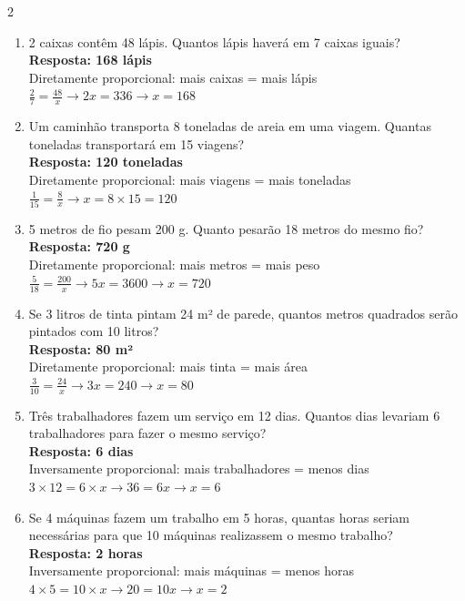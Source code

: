 \documentclass[11pt]{article}
\begin{document}
\begin{multicols}{2}
\begin{enumerate}[leftmargin=*, itemsep=15pt]
\item 2 caixas contêm 48 lápis. Quantos lápis haverá em 7 caixas iguais? \\
\textbf{Resposta: 168 lápis} \\
Diretamente proporcional: mais caixas = mais lápis \\
$\frac{2}{7} = \frac{48}{x} \rightarrow 2x = 336 \rightarrow x = 168$

\item Um caminhão transporta 8 toneladas de areia em uma viagem. Quantas toneladas transportará em 15 viagens? \\
\textbf{Resposta: 120 toneladas} \\
Diretamente proporcional: mais viagens = mais toneladas \\
$\frac{1}{15} = \frac{8}{x} \rightarrow x = 8 \times 15 = 120$

\item 5 metros de fio pesam 200 g. Quanto pesarão 18 metros do mesmo fio? \\
\textbf{Resposta: 720 g} \\
Diretamente proporcional: mais metros = mais peso \\
$\frac{5}{18} = \frac{200}{x} \rightarrow 5x = 3600 \rightarrow x = 720$

\item Se 3 litros de tinta pintam 24 m² de parede, quantos metros quadrados serão pintados com 10 litros? \\
\textbf{Resposta: 80 m²} \\
Diretamente proporcional: mais tinta = mais área \\
$\frac{3}{10} = \frac{24}{x} \rightarrow 3x = 240 \rightarrow x = 80$

\item Três trabalhadores fazem um serviço em 12 dias. Quantos dias levariam 6 trabalhadores para fazer o mesmo serviço? \\
\textbf{Resposta: 6 dias} \\
Inversamente proporcional: mais trabalhadores = menos dias \\
$3 \times 12 = 6 \times x \rightarrow 36 = 6x \rightarrow x = 6$

\item Se 4 máquinas fazem um trabalho em 5 horas, quantas horas seriam necessárias para que 10 máquinas realizassem o mesmo trabalho? \\
\textbf{Resposta: 2 horas} \\
Inversamente proporcional: mais máquinas = menos horas \\
$4 \times 5 = 10 \times x \rightarrow 20 = 10x \rightarrow x = 2$


\end{enumerate}
\end{multicols}
\end{document}
